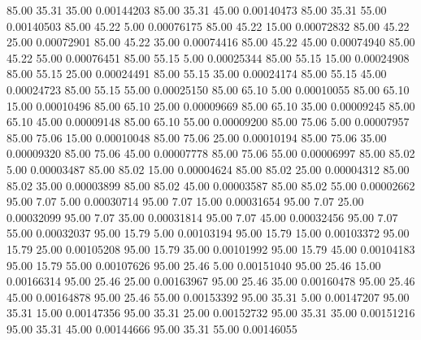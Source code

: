     85.00     35.31     35.00     0.00144203
     85.00     35.31     45.00     0.00140473
     85.00     35.31     55.00     0.00140503
     85.00     45.22      5.00     0.00076175
     85.00     45.22     15.00     0.00072832
     85.00     45.22     25.00     0.00072901
     85.00     45.22     35.00     0.00074416
     85.00     45.22     45.00     0.00074940
     85.00     45.22     55.00     0.00076451
     85.00     55.15      5.00     0.00025344
     85.00     55.15     15.00     0.00024908
     85.00     55.15     25.00     0.00024491
     85.00     55.15     35.00     0.00024174
     85.00     55.15     45.00     0.00024723
     85.00     55.15     55.00     0.00025150
     85.00     65.10      5.00     0.00010055
     85.00     65.10     15.00     0.00010496
     85.00     65.10     25.00     0.00009669
     85.00     65.10     35.00     0.00009245
     85.00     65.10     45.00     0.00009148
     85.00     65.10     55.00     0.00009200
     85.00     75.06      5.00     0.00007957
     85.00     75.06     15.00     0.00010048
     85.00     75.06     25.00     0.00010194
     85.00     75.06     35.00     0.00009320
     85.00     75.06     45.00     0.00007778
     85.00     75.06     55.00     0.00006997
     85.00     85.02      5.00     0.00003487
     85.00     85.02     15.00     0.00004624
     85.00     85.02     25.00     0.00004312
     85.00     85.02     35.00     0.00003899
     85.00     85.02     45.00     0.00003587
     85.00     85.02     55.00     0.00002662
     95.00      7.07      5.00     0.00030714
     95.00      7.07     15.00     0.00031654
     95.00      7.07     25.00     0.00032099
     95.00      7.07     35.00     0.00031814
     95.00      7.07     45.00     0.00032456
     95.00      7.07     55.00     0.00032037
     95.00     15.79      5.00     0.00103194
     95.00     15.79     15.00     0.00103372
     95.00     15.79     25.00     0.00105208
     95.00     15.79     35.00     0.00101992
     95.00     15.79     45.00     0.00104183
     95.00     15.79     55.00     0.00107626
     95.00     25.46      5.00     0.00151040
     95.00     25.46     15.00     0.00166314
     95.00     25.46     25.00     0.00163967
     95.00     25.46     35.00     0.00160478
     95.00     25.46     45.00     0.00164878
     95.00     25.46     55.00     0.00153392
     95.00     35.31      5.00     0.00147207
     95.00     35.31     15.00     0.00147356
     95.00     35.31     25.00     0.00152732
     95.00     35.31     35.00     0.00151216
     95.00     35.31     45.00     0.00144666
     95.00     35.31     55.00     0.00146055
